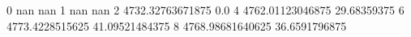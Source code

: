 0 nan nan
1 nan nan
2 4732.32763671875 0.0
4 4762.01123046875 29.68359375
6 4773.4228515625 41.09521484375
8 4768.98681640625 36.6591796875
